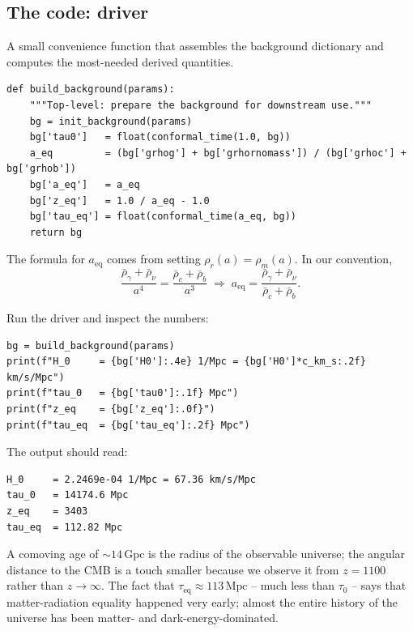 \subsection{The code: driver}

A small convenience function that assembles the background dictionary and computes the most-needed derived quantities.

\begin{codebox}
\begin{lstlisting}[style=python]
def build_background(params):
    """Top-level: prepare the background for downstream use."""
    bg = init_background(params)
    bg['tau0']   = float(conformal_time(1.0, bg))
    a_eq         = (bg['grhog'] + bg['grhornomass']) / (bg['grhoc'] + bg['grhob'])
    bg['a_eq']   = a_eq
    bg['z_eq']   = 1.0 / a_eq - 1.0
    bg['tau_eq'] = float(conformal_time(a_eq, bg))
    return bg
\end{lstlisting}
\end{codebox}

\noindent The formula for $a_\mathrm{eq}$ comes from setting $\rho_r(a) = \rho_m(a)$. In our convention,
\[
  \frac{\bar\rho_\gamma + \bar\rho_\nu}{a^4} = \frac{\bar\rho_c + \bar\rho_b}{a^3}
  \;\Longrightarrow\;
  a_\mathrm{eq} = \frac{\bar\rho_\gamma + \bar\rho_\nu}{\bar\rho_c + \bar\rho_b}.
\]

Run the driver and inspect the numbers:
\begin{codebox}
\begin{lstlisting}[style=python]
bg = build_background(params)
print(f"H_0     = {bg['H0']:.4e} 1/Mpc = {bg['H0']*c_km_s:.2f} km/s/Mpc")
print(f"tau_0   = {bg['tau0']:.1f} Mpc")
print(f"z_eq    = {bg['z_eq']:.0f}")
print(f"tau_eq  = {bg['tau_eq']:.2f} Mpc")
\end{lstlisting}
\end{codebox}
The output should read:
\begin{verbatim}
H_0     = 2.2469e-04 1/Mpc = 67.36 km/s/Mpc
tau_0   = 14174.6 Mpc
z_eq    = 3403
tau_eq  = 112.82 Mpc
\end{verbatim}
A comoving age of $\sim 14\,\mathrm{Gpc}$ is the radius of the observable universe; the angular distance to the CMB is a touch smaller because we observe it from $z = 1100$ rather than $z \to \infty$. The fact that $\tau_\mathrm{eq} \approx 113\,\mathrm{Mpc}$ -- much less than $\tau_0$ -- says that matter-radiation equality happened very early; almost the entire history of the universe has been matter- and dark-energy-dominated.

